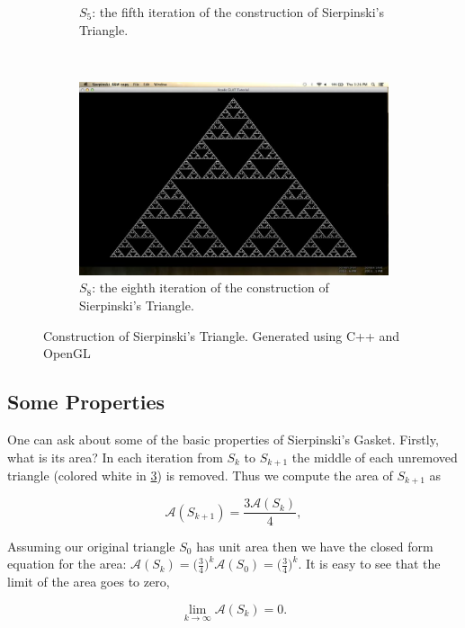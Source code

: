 \documentclass[11pt,oneside,final]{article}
\begin{document}
\begin{figure}[ht]
\begin{subfigure}[b]{0.22\textwidth}
		\caption{\(S_5\): the fifth iteration of the construction of 
		Sierpinski's Triangle.}
		\label{fig:sierptri3}
	\end{subfigure}
	~
	\begin{subfigure}[b]{0.22\textwidth}
		\includegraphics[width=\textwidth]{sierp8}
		\caption{\(S_8\): the eighth iteration of the construction of 
		Sierpinski's Triangle.}
		\label{fig:sierptri3}
	\end{subfigure}
	\caption{Construction of Sierpinski's Triangle. Generated using C++ and
	OpenGL}\label{fig:sierp-tri-construction}
\end{figure}

\subsection{Some Properties}
One can ask about some of the basic properties of Sierpinski's Gasket. Firstly,
what is its area?  In each iteration from \(S_k\) to \(S_{k+1}\) the middle of
each unremoved triangle (colored white in \ref{fig:sierp-tri-construction}) is
removed.  Thus we compute the area of \(S_{k+1}\) as

\[\mathcal A(S_{k+1}) = \frac{3 \mathcal A(S_k)}{4},\]

Assuming our original triangle \(S_0\) has unit area then we have the closed
form equation for the area: \(\mathcal A(S_k) = \big(\frac{3}{4}\big)^k\mathcal
A(S_0) = \big(\frac{3}{4}\big)^k\).  It is easy to see that the limit of the
area goes to zero,

\[\lim_{k \rightarrow \infty}\mathcal A(S_k) = 0.\]
\end{document}
